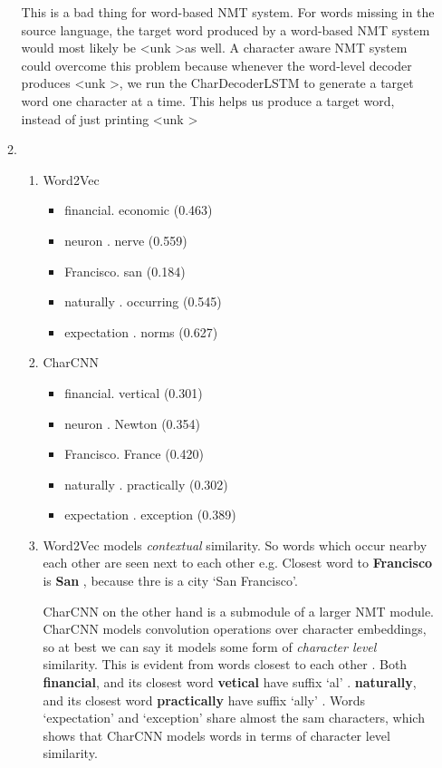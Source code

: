 \documentclass[]{article}
\begin{document}
\begin{enumerate}
\begin{enumerate}
		This is a bad thing for word-based NMT system.  
		For words missing in the source language, the target word produced by a word-based NMT system would most likely be \textless unk \textgreater as well. A character aware NMT system could overcome this problem because whenever the word-level decoder produces \textless unk \textgreater, we run the CharDecoderLSTM to generate a target word one character at a time. This helps us produce a target word, instead of just printing \textless unk \textgreater
		
		\item
		
		\begin{enumerate}
			\item Word2Vec
				\begin{itemize}
				\item financial. economic (0.463)
				\item neuron . nerve (0.559)
				\item Francisco. san (0.184)
				\item naturally . occurring (0.545)
				\item expectation	. norms (0.627)
				\end{itemize}
				
			\item CharCNN
				\begin{itemize}
				\item financial. vertical (0.301)
				\item neuron . Newton (0.354)
				\item Francisco. France (0.420)
				\item naturally . practically (0.302)
				\item expectation	. exception (0.389)
				\end{itemize}
				
			\item
			Word2Vec models \textsl{contextual} similarity. So words which occur nearby each other are seen next to each other e.g. Closest word to \textbf{Francisco} is \textbf{San} , because thre is a city `San Francisco'.
			
			CharCNN on the other hand is a submodule of a larger NMT module. CharCNN models convolution operations over character embeddings, so at best we can say it models some form of \textsl{character level} similarity. This is evident from words closest to each other . Both \textbf{financial}, and its closest word \textbf{vetical} have suffix `al' .  \textbf{naturally}, and its closest word \textbf{practically} have suffix `ally' . Words `expectation' and `exception' share almost the sam characters, which shows that CharCNN models words in terms of character level similarity.
		\end{enumerate}
	

\end{enumerate}
\end{enumerate}
\end{document}
